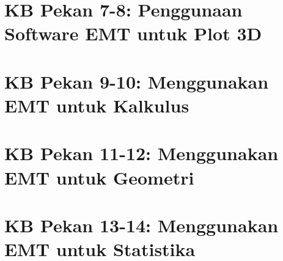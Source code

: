 \documentclass{report}
\begin{document}
\newpage
\chapter{KB Pekan 7-8: Penggunaan Software EMT untuk Plot 3D}


\newpage
\chapter{KB Pekan 9-10: Menggunakan EMT untuk Kalkulus}


\newpage
\chapter{KB Pekan 11-12: Menggunakan EMT untuk Geometri}


\newpage
\chapter{KB Pekan 13-14: Menggunakan EMT untuk Statistika}

\end{document}
